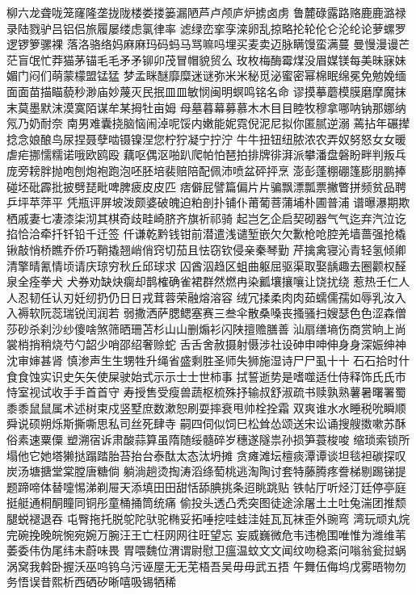 柳六龙聋咙笼窿隆垄拢陇楼娄搂篓漏陋芦卢颅庐炉掳卤虏
鲁麓碌露路赂⿅鹿潞禄录陆戮驴吕铝侣旅履屡缕虑氯律率
滤绿峦挛孪滦卵乱掠略抡轮伦仑沦纶论萝螺罗逻锣箩骡裸
落洛骆络妈⿇麻玛码蚂马骂嘛吗埋买麦卖迈脉瞒馒蛮满蔓
曼慢漫谩芒茫盲氓忙莽猫茅锚⽑毛⽭矛铆卯茂冒帽貌贸么
玫枚梅酶霉煤没眉媒镁每美昧寐妹媚门闷们萌蒙檬盟锰猛
梦孟眯醚靡糜迷谜弥⽶米秘觅泌蜜密幂棉眠绵冕免勉娩缅
⾯面苗描瞄藐秒渺庙妙蔑灭民抿⽫皿敏悯闽明螟鸣铭名命
谬摸摹蘑模膜磨摩魔抹末莫墨默沫漠寞陌谋牟某拇牡亩姆
母墓暮幕募慕⽊木⽬目睦牧穆拿哪呐钠那娜纳氖乃奶耐奈
南男难囊挠脑恼闹淖呢馁内嫩能妮霓倪泥尼拟你匿腻逆溺
蔫拈年碾撵捻念娘酿鸟尿捏聂孽啮镊镍涅您柠狞凝宁拧泞
⽜牛扭钮纽脓浓农弄奴努怒⼥女暖虐疟挪懦糯诺哦欧鸥殴
藕呕偶沤啪趴爬帕怕琶拍排牌徘湃派攀潘盘磐盼畔判叛乓
庞旁耪胖抛咆刨炮袍跑泡呸胚培裴赔陪配佩沛喷盆砰抨烹
澎彭蓬棚硼篷膨朋鹏捧碰坯砒霹批披劈琵毗啤脾疲⽪皮匹
痞僻屁譬篇偏⽚片骗飘漂瓢票撇瞥拼频贫品聘乒坪苹萍平
凭瓶评屏坡泼颇婆破魄迫粕剖扑铺仆莆葡菩蒲埔朴圃普浦
谱曝瀑期欺栖戚妻七凄漆柒沏其棋奇歧畦崎脐齐旗祈祁骑
起岂乞企启契砌器⽓气迄弃汽泣讫掐恰洽牵扦钎铅千迁签
仟谦乾黔钱钳前潜遣浅谴堑嵌⽋欠歉枪呛腔羌墙蔷强抢橇
锹敲悄桥瞧乔侨巧鞘撬翘峭俏窍切茄且怯窃钦侵亲秦琴勤
芹擒禽寝沁青轻氢倾卿清擎晴氰情顷请庆琼穷秋丘邱球求
囚酋泅趋区蛆曲躯屈驱渠取娶龋趣去圈颧权醛泉全痊拳⽝
犬券劝缺炔瘸却鹊榷确雀裙群然燃冉染瓤壤攘嚷让饶扰绕
惹热壬仁⼈人忍韧任认刃妊纫扔仍⽇日戎茸蓉荣融熔溶容
绒冗揉柔⾁肉茹蠕儒孺如辱乳汝⼊入褥软阮蕊瑞锐闰润若
弱撒洒萨腮鳃塞赛三叁伞散桑嗓丧搔骚扫嫂瑟⾊色涩森僧
莎砂杀刹沙纱傻啥煞筛晒珊苫杉⼭山删煽衫闪陕擅赡膳善
汕扇缮墒伤商赏晌上尚裳梢捎稍烧芍勺韶少哨邵绍奢赊蛇
⾆舌舍赦摄射慑涉社设砷申呻伸⾝身深娠绅神沈审婶甚肾
慎渗声⽣生甥牲升绳省盛剩胜圣师失狮施湿诗⼫尸虱⼗十
⽯石拾时什⾷食蚀实识史⽮矢使屎驶始式⽰示⼠士世柿事
拭誓逝势是嗜噬适仕侍释饰⽒氏市恃室视试收⼿手⾸首守
寿授售受瘦兽蔬枢梳殊抒输叔舒淑疏书赎孰熟薯暑曙署蜀
⿉黍⿏鼠属术述树束戍竖墅庶数漱恕刷耍摔衰甩帅栓拴霜
双爽谁⽔水睡税吮瞬顺舜说硕朔烁斯撕嘶思私司丝死肆寺
嗣四伺似饲巳松耸怂颂送宋讼诵搜艘擞嗽苏酥俗素速粟僳
塑溯宿诉肃酸蒜算虽隋随绥髓碎岁穗遂隧祟孙损笋蓑梭唆
缩琐索锁所塌他它她塔獭挞蹋踏胎苔抬台泰酞太态汰坍摊
贪瘫滩坛檀痰潭谭谈坦毯袒碳探叹炭汤塘搪堂棠膛唐糖倘
躺淌趟烫掏涛滔绦萄桃逃淘陶讨套特藤腾疼誊梯剔踢锑提
题蹄啼体替嚏惕涕剃屉天添填⽥田甜恬舔腆挑条迢眺跳贴
铁帖厅听烃汀廷停亭庭挺艇通桐酮瞳同铜彤童桶捅筒统痛
偷投头透凸秃突图徒途涂屠⼟土吐兔湍团推颓腿蜕褪退吞
屯臀拖托脱鸵陀驮驼椭妥拓唾挖哇蛙洼娃⽡瓦袜歪外豌弯
湾玩顽丸烷完碗挽晚皖惋宛婉万腕汪王亡枉⽹网往旺望忘
妄威巍微危韦违桅围唯惟为潍维苇萎委伟伪尾纬未蔚味畏
胃喂魏位渭谓尉慰卫瘟温蚊⽂文闻纹吻稳紊问嗡翁瓮挝蜗
涡窝我斡卧握沃巫呜钨乌污诬屋⽆无芜梧吾吴⽏毋武五捂
午舞伍侮坞戊雾晤物勿务悟误昔熙析西硒矽晰嘻吸锡牺稀

